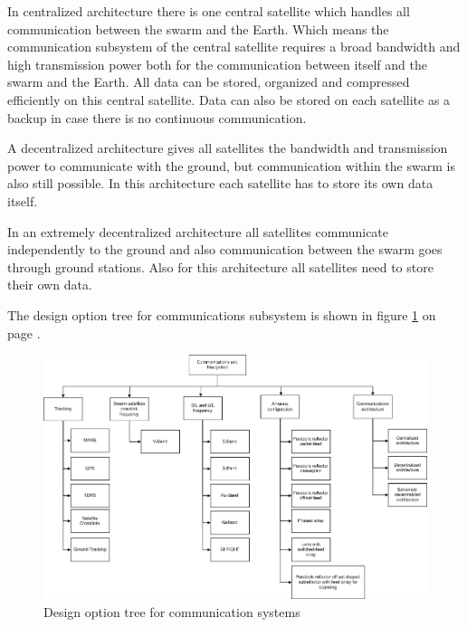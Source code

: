 In centralized architecture there is one central satellite which handles all communication between the swarm and the Earth. Which means the communication subsystem of the central satellite requires a broad bandwidth and high transmission power both for the communication between itself and the swarm and the Earth. All data can be stored, organized and compressed efficiently on this central satellite. Data can also be stored on each satellite as a backup in case there is no continuous communication.

A decentralized architecture gives all satellites the bandwidth and transmission power to communicate with the ground, but communication within the swarm is also still possible. In this architecture each satellite has to store its own data itself.

In an extremely decentralized architecture all satellites communicate independently to the ground and also communication between the swarm goes through ground stations. Also for this architecture all satellites need to store their own data.

The design option tree for communications subsystem is shown in figure \ref{fig:DOCom} on page \pageref{fig:DOCom}.

\begin{figure} [ht!]
	\centering
	\includegraphics[width=0.9\textheight,angle=90]{chapters/img/DOTCom.jpg}	
	\caption{Design option tree for communication systems}
	\label{fig:DOCom}
\end{figure}
